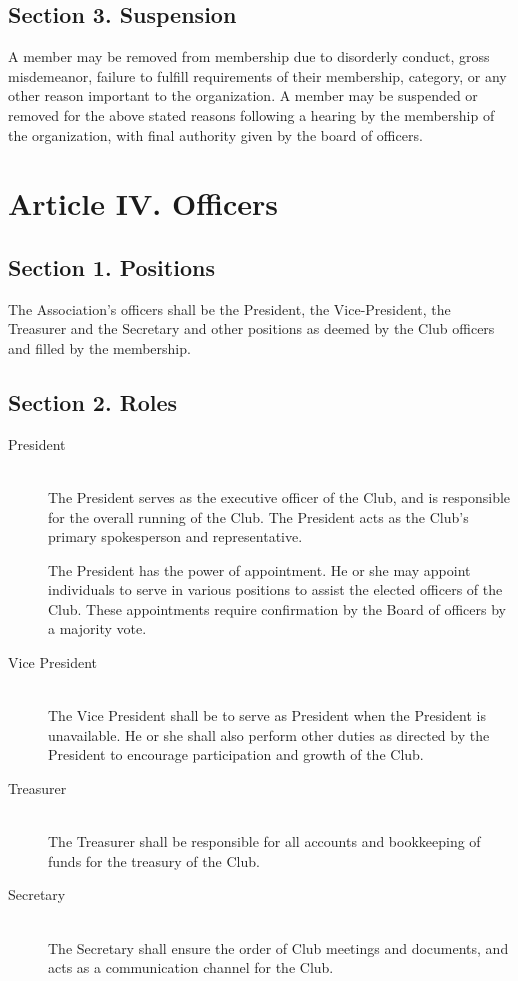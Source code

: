\documentclass{article}
\begin{document}
  \subsection{Section 3. Suspension}
    A member may be removed from membership due to disorderly conduct, gross misdemeanor, failure to fulfill requirements of their membership, category, or any other reason important to the organization. A member may be suspended or removed for the above stated reasons following a hearing by the membership of the organization, with final authority given by the board of officers.

\section{Article IV. Officers}

  \subsection{Section 1. Positions}
    The Association’s officers shall be the President, the Vice-President, the Treasurer and the Secretary and other positions as deemed by the Club officers and filled by the membership.

  \subsection{Section 2. Roles}
    \begin{description}
      \item[President] ~\\
        The President serves as the executive officer of the Club, and is responsible for the overall running of the Club. The President acts as the Club's primary spokesperson and representative.

        The President has the power of appointment. He or she may appoint individuals to serve in various positions to assist the elected officers of the Club. These appointments require confirmation by the Board of officers by a majority vote.

      \item[Vice President] ~\\
        The Vice President shall be to serve as President when the President is unavailable. He or she shall also perform other duties as directed by the President to encourage participation and growth of the Club.

      \item[Treasurer] ~\\
        The Treasurer shall be responsible for all accounts and bookkeeping of funds for the treasury of the Club.

      \item[Secretary] ~\\
        The Secretary shall ensure the order of Club meetings and documents, and acts as a communication channel for the Club.
    \end{description}
\end{document}

